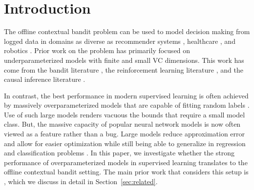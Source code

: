 \newcommand{\one}{\mathbbm{1}}

\section{Introduction}


The offline contextual bandit problem can be used to model decision making from logged data in domains as diverse as recommender systems \citep{li2010contextual, bottou2013counterfactual}, healthcare \citep{Prasad2017ARL, Raghu2017DeepRL}, and robotics \citep{pinto2016supersizing}.
Prior work on the problem has primarily focused on underparameterized models with finite and small VC dimensions. This work has come from the bandit literature \citep{strehl2010learning, swaminathan2015counterfactual, swaminathan2015self}, the reinforcement learning literature \citep{munos2008finite, chen2019information}, and the causal inference literature \citep{bottou2013counterfactual, athey2017efficient, kallus2018balanced, zhou2018offline}.



In contrast, the best performance in modern supervised learning is often achieved by massively overparameterized models that are capable of fitting random labels \citep{zhang2016understanding}. Use of such large models renders vacuous the bounds that require a small model class. But, the massive capacity of popular neural network models is now often viewed as a feature rather than a bug. Large models reduce approximation error and allow for easier optimization \citep{du2018gradient} while still being able to generalize in regression and classification problems \citep{belkin2018overfitting, belkin2019does}.
In this paper, we investigate whether the strong performance of overparameterized models in supervised learning translates to the offline contextual bandit setting.
The main prior work that considers this setup is \citep{joachims2018deep}, which we discuss in detail in Section~\ref{sec:related}.



